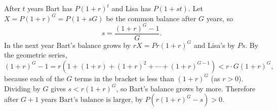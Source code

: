 After $t$ years Bart has $P(1+r)^t$ and Lisa has $P(1+st)$. Let $X=P(1+r)^G=P(1+sG)$ be the common balance after $G$ years, so
\[s=\dfrac{(1+r)^G-1}{G}.\]
In the next year Bart's balance grows by $rX=Pr(1+r)^G$ and Lisa's by $Ps$. By the geometric series,
\[(1+r)^G-1=r\left(1+(1+r)+(1+r)^2+\cdots+(1+r)^{G-1}\right)<r\cdot G(1+r)^G,\]
because each of the $G$ terms in the bracket is less than $(1+r)^G$ (as $r>0$). Dividing by $G$ gives $s<r(1+r)^G$, so Bart's balance grows by more. Therefore after $G+1$ years $\boxed{\text{Bart's balance is larger}}$, by $P\left(r(1+r)^G-s\right)>0$.
